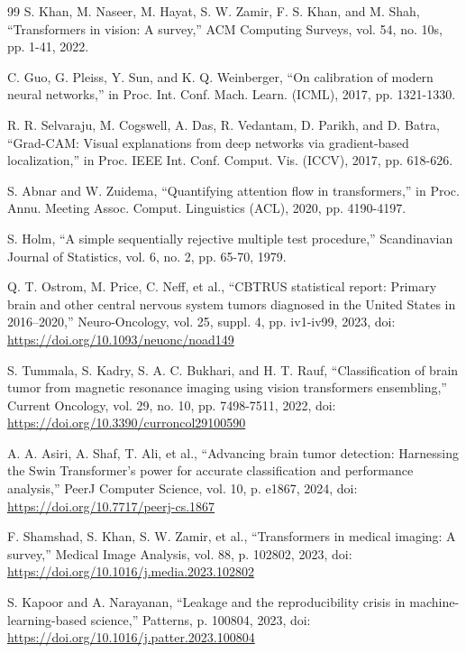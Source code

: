 \documentclass[final,3p,times,number]{elsarticle}
\begin{document}
\begin{thebibliography}{99}
 S. Khan, M. Naseer, M. Hayat, S. W. Zamir, F. S. Khan, and M. Shah, ``Transformers in vision: A survey,'' ACM Computing Surveys, vol. 54, no. 10s, pp. 1-41, 2022.

 C. Guo, G. Pleiss, Y. Sun, and K. Q. Weinberger, ``On calibration of modern neural networks,'' in Proc. Int. Conf. Mach. Learn. (ICML), 2017, pp. 1321-1330.

 R. R. Selvaraju, M. Cogswell, A. Das, R. Vedantam, D. Parikh, and D. Batra, ``Grad-CAM: Visual explanations from deep networks via gradient-based localization,'' in Proc. IEEE Int. Conf. Comput. Vis. (ICCV), 2017, pp. 618-626.

 S. Abnar and W. Zuidema, ``Quantifying attention flow in transformers,'' in Proc. Annu. Meeting Assoc. Comput. Linguistics (ACL), 2020, pp. 4190-4197.

 S. Holm, ``A simple sequentially rejective multiple test procedure,'' Scandinavian Journal of Statistics, vol. 6, no. 2, pp. 65-70, 1979.

 Q. T. Ostrom, M. Price, C. Neff, et al., ``CBTRUS statistical report: Primary brain and other central nervous system tumors diagnosed in the United States in 2016--2020,'' Neuro-Oncology, vol. 25, suppl. 4, pp. iv1-iv99, 2023, doi: \url{https://doi.org/10.1093/neuonc/noad149}

 S. Tummala, S. Kadry, S. A. C. Bukhari, and H. T. Rauf, ``Classification of brain tumor from magnetic resonance imaging using vision transformers ensembling,'' Current Oncology, vol. 29, no. 10, pp. 7498-7511, 2022, doi: \url{https://doi.org/10.3390/curroncol29100590}

 A. A. Asiri, A. Shaf, T. Ali, et al., ``Advancing brain tumor detection: Harnessing the Swin Transformer's power for accurate classification and performance analysis,'' PeerJ Computer Science, vol. 10, p. e1867, 2024, doi: \url{https://doi.org/10.7717/peerj-cs.1867}

 F. Shamshad, S. Khan, S. W. Zamir, et al., ``Transformers in medical imaging: A survey,'' Medical Image Analysis, vol. 88, p. 102802, 2023, doi: \url{https://doi.org/10.1016/j.media.2023.102802}

 S. Kapoor and A. Narayanan, ``Leakage and the reproducibility crisis in machine-learning-based science,'' Patterns, p. 100804, 2023, doi: \url{https://doi.org/10.1016/j.patter.2023.100804}


\end{thebibliography}
\end{document}
